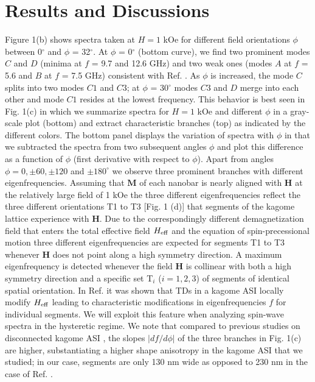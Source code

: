 \documentclass[aps,prl,preprint,showpacs,superscriptaddress,groupedaddress]{revtex4}%
\begin{document}
\section{Results and Discussions}
Figure 1(b) shows spectra taken at $ H = 1$ kOe for different field orientations $\phi$ between 0$^{\circ}$ and $\phi$ = 32$^{\circ}$. At $\phi$ = 0$^{\circ}$ (bottom curve), we find two prominent modes $C$ and $D$  (minima at $f$ = 9.7 and 12.6 GHz)  and two weak ones (modes $A$ at $f$ = 5.6 and $B$ at $f$ = 7.5 GHz)  consistent with Ref. \cite{bhat2016magnetization}. As $\phi$ is increased, the mode $C$ splits into two modes $C1$ and $C3$; at $\phi$ = 30$^{\circ}$ modes $C3$ and $D$ merge into each other and mode $C1$ resides at the lowest frequency. This behavior is best seen in  Fig. 1(c) in which we summarize spectra for $H=1$ kOe and different $\phi$ in a gray-scale plot (bottom) and extract characteristic branches (top) as indicated by the different colors. The bottom panel displays the variation of spectra with $\phi$ in that we subtracted the spectra from two subsequent angles $\phi$ and plot this difference as a function of $\phi$ (first derivative with respect to $\phi$). Apart from angles $\phi=0, \pm60, \pm 120$ and $\pm 180^{\circ}$ we observe three prominent branches with different eigenfrequencies. Assuming that $\mathbf{M}$ of each nanobar is nearly aligned with $\mathbf{H}$ at the relatively large field of 1 kOe the three different eigenfrequencies reflect the three different orientations T1 to T3 [Fig. 1 (d)] that segments of the kagome lattice experience with $\mathbf{H}$. Due to the correspondingly different demagnetization field that enters the total effective field $H_{\rm eff}$ and the equation of spin-precessional motion \cite{gurevich1996magnetization} three different eigenfrequencies are expected for segments T1 to T3 whenever $\mathbf{H}$ does not point along a high symmetry direction. A maximum eigenfrequency is detected whenever the field $\mathbf{H}$ is collinear with both a high symmetry direction and a specific set T$_i$ ($i=1,2,3$) of segments of identical spatial orientation. In Ref. \cite{bhat2016magnetization} it was shown that TDs in a kagome ASI locally modify $H_{\rm eff}$ leading to characteristic modifications in eigenfrequencies $f$ for individual segments. We will exploit this feature when analyzing spin-wave spectra in the hysteretic regime. We note that compared to previous studies on disconnected kagome ASI \cite{zhou2016large}, the slopes $ |df/d \phi| $ of the three branches in Fig. 1(c) are higher, substantiating a higher shape anisotropy in the kagome ASI that we studied; in our case, segments are only 130 nm wide as opposed to 230 nm in the case of Ref. \cite{zhou2016large}. \\
\end{document}
